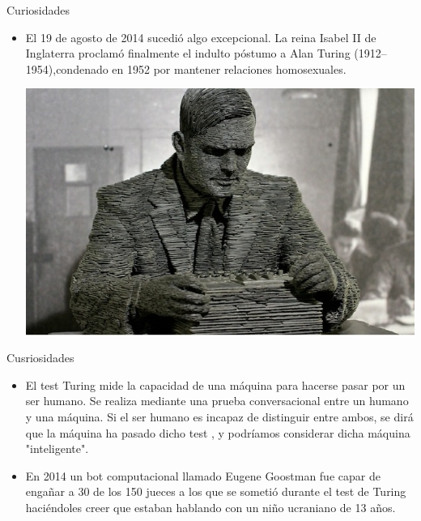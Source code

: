 \documentclass{beamer}
\begin{document}
\begin{frame}{Curiosidades}
    \begin{itemize}
        \item El 19 de agosto de 2014 sucedió algo excepcional. La reina Isabel II de Inglaterra proclamó finalmente el indulto póstumo a Alan Turing (1912–1954),condenado en 1952 por mantener relaciones homosexuales.\pause
        \begin{center}
            \includegraphics[scale=0.35]{indulto.png}
        \end{center}
    \end{itemize}
\end{frame}
\begin{frame}{Cusriosidades} 
\begin{itemize}
    \item El test Turing mide la capacidad de una máquina para hacerse pasar por un ser humano. Se realiza mediante una prueba conversacional entre un humano y una máquina. Si el ser humano es incapaz de distinguir entre ambos, se dirá que la máquina ha pasado dicho test , y podríamos considerar dicha máquina "inteligente".\pause
    \item En 2014 un bot computacional llamado Eugene Goostman fue capar de engañar a 30 de los 150 jueces a los que se sometió durante el test de Turing haciéndoles creer que estaban hablando con un niño ucraniano de 13 años.
\end{itemize}
\end{frame}
\end{document}

